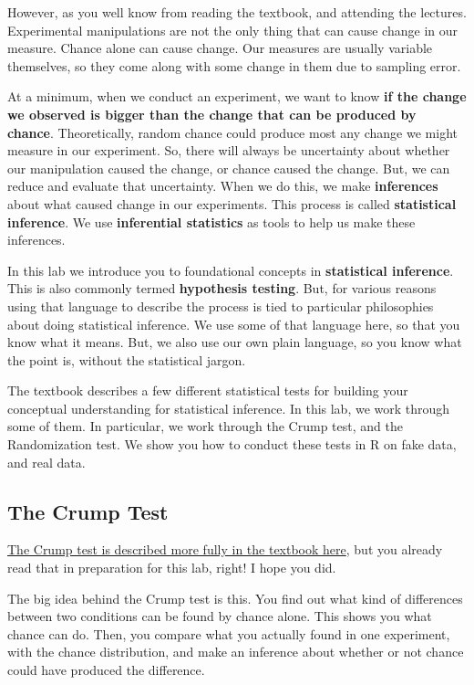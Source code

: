 \documentclass[
]{book}
\begin{document}
However, as you well know from reading the textbook, and attending the lectures. Experimental manipulations are not the only thing that can cause change in our measure. Chance alone can cause change. Our measures are usually variable themselves, so they come along with some change in them due to sampling error.

At a minimum, when we conduct an experiment, we want to know \textbf{if the change we observed is bigger than the change that can be produced by chance}. Theoretically, random chance could produce most any change we might measure in our experiment. So, there will always be uncertainty about whether our manipulation caused the change, or chance caused the change. But, we can reduce and evaluate that uncertainty. When we do this, we make \textbf{inferences} about what caused change in our experiments. This process is called \textbf{statistical inference}. We use \textbf{inferential statistics} as tools to help us make these inferences.

In this lab we introduce you to foundational concepts in \textbf{statistical inference}. This is also commonly termed \textbf{hypothesis testing}. But, for various reasons using that language to describe the process is tied to particular philosophies about doing statistical inference. We use some of that language here, so that you know what it means. But, we also use our own plain language, so you know what the point is, without the statistical jargon.

The textbook describes a few different statistical tests for building your conceptual understanding for statistical inference. In this lab, we work through some of them. In particular, we work through the Crump test, and the Randomization test. We show you how to conduct these tests in R on fake data, and real data.

\hypertarget{the-crump-test}{%
\subsection{The Crump Test}\label{the-crump-test}}

\href{https://crumplab.github.io/statistics/foundations-for-inference.html\#the-crump-test}{The Crump test is described more fully in the textbook here}, but you already read that in preparation for this lab, right! I hope you did.

The big idea behind the Crump test is this. You find out what kind of differences between two conditions can be found by chance alone. This shows you what chance can do. Then, you compare what you actually found in one experiment, with the chance distribution, and make an inference about whether or not chance could have produced the difference.
\end{document}
